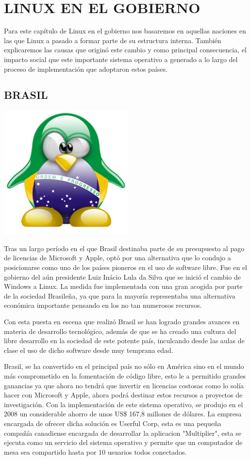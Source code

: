\chapter*{LINUX EN EL GOBIERNO}
Para este capítulo de Linux en el gobierno nos basaremos en aquellas naciones en las que Linux a pasado a formar parte de su estructura interna. También explicaremos las 
causas que originó este cambio y como principal consecuencia, el impacto social que este importante sistema operativo a generado a lo largo del proceso de implementación que 
adoptaron estos países.

\section*{BRASIL}
\includegraphics[scale=1]{img/cp03/img0301.png}

Tras un largo período en el que Brasil destinaba parte de su presupuesto al pago de licencias de Microsoft y Apple, optó por una alternativa que lo condujo a posicionarse 
como uno de los países pioneros en el uso de software libre. Fue en el gobierno del aún presidente Luiz Inácio Lula da Silva que se inició el cambio de Windows a Linux. La 
medida fue implementada con una gran acogida por parte de la sociedad Brasileña, ya que para la mayoría representaba una alternativa económica importante pensando en los no 
tan numerosos recursos.

Con esta puesta en escena que realizó Brasil se han logrado grandes avances en materia de desarrollo tecnológico, además de que se ha creado una cultura del libre desarrollo 
en la sociedad de este potente país, inculcando desde las aulas de clase el uso de dicho software desde muy temprana edad.

Brasil, se ha convertido en el principal país no sólo en América sino en el mundo más comprometido en la fomentación de código libre, esto le a permitido grandes ganancias ya 
que ahora no tendrá que invertir en licencias costosas como lo solía hacer con Microsoft y Apple, ahora podrá destinar estos recursos a proyectos de investigación. Con la 
implementación de este sistema operativo, se produjo en el 2008 un considerable ahorro de unos US\$ 167,8 millones de dólares. La empresa encargada de ofrecer dicha solución 
es Userful Corp, esta es una pequeña compañía canadiense encargada de desarrollar la aplicacion "Multiplier", esta se ejecuta como un servicio del sistema operativo y permite 
que un computador de mesa sea compartido hasta por 10 usuarios todos conectados.

